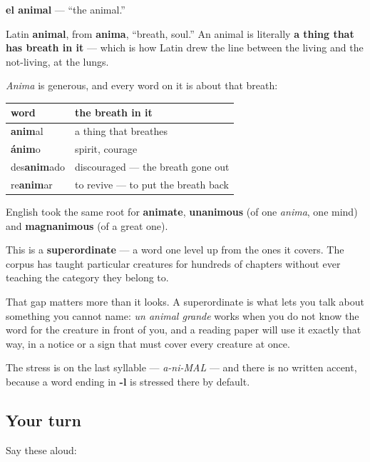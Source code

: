 \begin{cousinweb}
\textbf{el animal} — \textquotedblleft{}the animal.\textquotedblright{}

Latin \textbf{animal}, from \textbf{anima}, \textquotedblleft{}breath, soul.\textquotedblright{} An animal is literally \textbf{a thing that has breath in it} — which is how Latin drew the line between the living and the not-living, at the lungs.

\emph{Anima} is generous, and every word on it is about that breath:

\noindent
\begin{tabularx}{\linewidth}{@{}>{\raggedright\arraybackslash}X>{\raggedright\arraybackslash}X@{}}
\toprule
\textbf{word} & \textbf{the breath in it} \\
\midrule
\textbf{anim}al & a thing that breathes \\
\textbf{ánim}o & spirit, courage \\
des\textbf{anim}ado & discouraged — the breath gone out \\
re\textbf{anim}ar & to revive — to put the breath back \\
\bottomrule
\end{tabularx}

English took the same root for \textbf{animate}, \textbf{unanimous} (of one \emph{anima}, one mind) and \textbf{magnanimous} (of a great one).
\end{cousinweb}

\begin{grammarlens}[title={Grammar Lens: the word that covers the others}]
This is a \textbf{superordinate} — a word one level up from the ones it covers. The corpus has taught particular creatures for hundreds of chapters without ever teaching the category they belong to.

That gap matters more than it looks. A superordinate is what lets you talk about something you cannot name: \emph{un animal grande} works when you do not know the word for the creature in front of you, and a reading paper will use it exactly that way, in a notice or a sign that must cover every creature at once.

The stress is on the last syllable — \emph{a-ni-MAL} — and there is no written accent, because a word ending in \textbf{-l} is stressed there by default.
\end{grammarlens}

\subsection*{Your turn}
Say these aloud:


